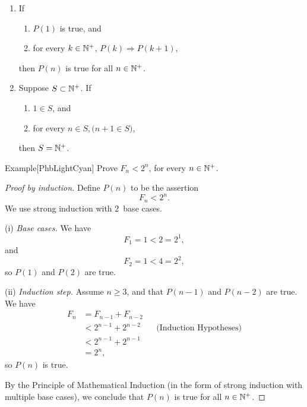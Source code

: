 \documentclass[../MATH-2000-Notes.tex]{subfiles}
\begin{document}
\begin{Proposition}
\begin{enumerate}
        \item \label{pr-OtherInduct-n+1}
              If
              \begin{enumerate}
                  \item \label{pr-OtherInduct-n+1-base}
                        $P(1)$ is true,
                        and
                  \item \label{pr-OtherInduct-n+1-step}
                        for every $ k \in \mathbb{N}^+$, $P(k) \Rightarrow P(k+1)$,
              \end{enumerate}
              then $P(n)$ is true for all $n \in \mathbb{N}^+$.

        \item \label{pr-OtherInduct-set}  %
              Suppose $S \subset \mathbb{N}^+$. If
              \begin{enumerate} \renewcommand{\theenumi}{\roman{enumi}}
                  \item \label{InductionSet-base} $1 \in S$,
                        and
                  \item \label{InductionSet-step}
                        for every $n \in S, \bigl( n+1 \in S \bigr)$,
              \end{enumerate}
              then $S = \mathbb{N}^+$.

    \end{enumerate}
\end{Proposition}
\begin{commentbox}{Example}[{PhbLightCyan}]
    \label{Fn<2nEg}
    Prove $F_n < 2^n$, for every $n \in \mathbb{N}^+$.
\end{commentbox}
\begin{proof}[Proof by induction]
    Define $P(n)$ to be the assertion
    $$ F_n < 2^n .$$
    We use strong induction with $2$~base cases.

    (i) \emph{Base cases.}
    We have
    $$ F_1 = 1 < 2 = 2^1 ,$$
    and
    $$ F_2 =1 < 4 = 2^2 ,$$
    so $P(1)$ and $P(2)$ are true.

    (ii) \emph{Induction step.} Assume $n \ge 3$, and that $P(n-1)$ and $P(n-2)$ are true. We have
    \begin{align*} F_n
         & = F_{n-1} + F_{n-2}
        \\&< 2^{n-1} + 2^{n-2} && \text{(Induction Hypotheses)}
        \\&< 2^{n-1} + 2^{n-1}
        \\&= 2^n
        ,\end{align*}
    so $P(n)$ is true.

    By the Principle of Mathematical Induction (in the form of strong induction with multiple base cases), we conclude that $P(n)$ is true for all $n \in \mathbb{N}^+$.
\end{proof}
\end{document}
